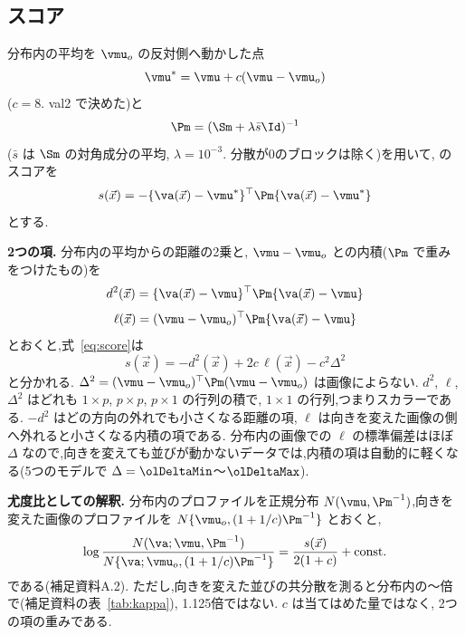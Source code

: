\subsection{スコア}
\label{sec:score}
分布内の平均を $\vmu_{o}$ の反対側へ動かした点
\begin{equation}
\vmu^{*}=\vmu+c(\vmu-\vmu_{o})
\label{eq:mustar}
\end{equation}
($c=8$. val2 で決めた)と
\begin{equation}
\Pm=(\Sm+\lambda\bar{s}\Id)^{-1}
\label{eq:prec}
\end{equation}
($\bar{s}$ は $\Sm$ の対角成分の平均, $\lambda=10^{-3}$. 分散が0のブロックは除く)を用いて, \Ours{}のスコアを
\begin{equation}
s(\vec{x})=-\{\va(\vec{x})-\vmu^{*}\}^{\top}\Pm\{\va(\vec{x})-\vmu^{*}\}
\label{eq:score}
\end{equation}
とする.

\textbf{2つの項.} 分布内の平均からの距離の2乗と, $\vmu-\vmu_{o}$ との内積($\Pm$ で重みをつけたもの)を
\begin{equation}
d^{2}(\vec{x})=\{\va(\vec{x})-\vmu\}^{\top}\Pm\{\va(\vec{x})-\vmu\}
\label{eq:dsq}
\end{equation}
\begin{equation}
\ell(\vec{x})=(\vmu-\vmu_{o})^{\top}\Pm\{\va(\vec{x})-\vmu\}
\label{eq:ell}
\end{equation}
とおくと,式~\eqref{eq:score}は
\begin{equation}
s(\vec{x})=-d^{2}(\vec{x})+2c\,\ell(\vec{x})-c^{2}\Delta^{2}
\label{eq:expand}
\end{equation}
と分かれる. $\Delta^{2}=(\vmu-\vmu_{o})^{\top}\Pm(\vmu-\vmu_{o})$ は画像によらない. $d^{2}$, $\ell$, $\Delta^{2}$ はどれも $1\times p$, $p\times p$, $p\times 1$ の行列の積で, $1\times 1$ の行列,つまりスカラーである. $-d^{2}$ はどの方向の外れでも小さくなる距離の項, $\ell$ は向きを変えた画像の側へ外れると小さくなる内積の項である. 分布内の画像での $\ell$ の標準偏差はほぼ $\Delta$ なので,向きを変えても並びが動かないデータでは,内積の項は自動的に軽くなる(5つのモデルで $\Delta=\olDeltaMin$〜$\olDeltaMax$).

\textbf{尤度比としての解釈.} 分布内のプロファイルを正規分布 $N(\vmu,\Pm^{-1})$,向きを変えた画像のプロファイルを $N\{\vmu_{o},(1+1/c)\Pm^{-1}\}$ とおくと,
\begin{equation}
\log\frac{N(\va;\vmu,\Pm^{-1})}{N\{\va;\vmu_{o},(1+1/c)\Pm^{-1}\}}=\frac{s(\vec{x})}{2(1+c)}+\mathrm{const.}
\label{eq:llr}
\end{equation}
である(補足資料A.2). ただし,向きを変えた並びの共分散を測ると分布内の\olKapMin{}〜\olKapMax{}倍で(補足資料の表~\ref{tab:kappa}), 1.125倍ではない. $c$ は当てはめた量ではなく, 2つの項の重みである.

